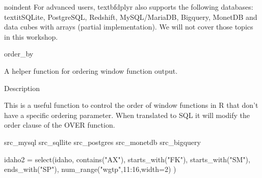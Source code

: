 	noindent For advanced users, textbf{dplyr} also supports the following databases: textit{SQLite, PostgreSQL, Redshift, MySQL/MariaDB, Bigquery, MonetDB} and data cubes with arrays (partial implementation). We will not cover those topics in this workshop.
	




order_by 

A helper function for ordering window function output.

Description

This is a useful function to control the order of window functions in R that don’t have a specific
ordering parameter. When translated to SQL it will modify the order clause of the OVER function.


src_mysql
src_sqllite
src_postgres
src_monetdb
src_bigquery


idaho2 = select(idaho,
contains("AX"),
starts_with("FK"),
starts_with("SM"),
ends_with("SP"),
num_range("wgtp",11:16,width=2)
)

